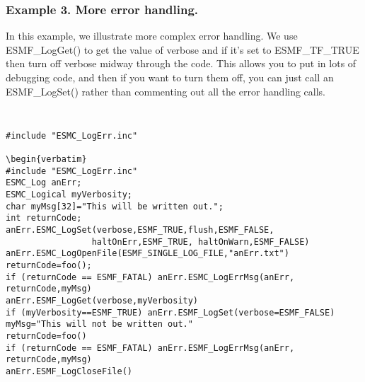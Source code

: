 \subsubsection{Example 3. More error handling. }

In this example, we illustrate more complex error handling.  We use
ESMF\_LogGet() to get the value of verbose and if it's set to ESMF\_TF\_TRUE
then turn off verbose midway through the code.  This allows you to put in lots
of debugging code, and then if you want to turn them off, you can just call
an ESMF\_LogSet() rather than commenting out all the error handling calls.
{\tt
\begin{verbatim}
#include "ESMC_LogErr.inc"

\begin{verbatim}
#include "ESMC_LogErr.inc" 
ESMC_Log anErr;
ESMC_Logical myVerbosity;
char myMsg[32]="This will be written out.";
int returnCode; 
anErr.ESMC_LogSet(verbose,ESMF_TRUE,flush,ESMF_FALSE,
                 haltOnErr,ESMF_TRUE, haltOnWarn,ESMF_FALSE)
anErr.ESMC_LogOpenFile(ESMF_SINGLE_LOG_FILE,"anErr.txt")
returnCode=foo();
if (returnCode == ESMF_FATAL) anErr.ESMC_LogErrMsg(anErr, returnCode,myMsg) 
anErr.ESMF_LogGet(verbose,myVerbosity)
if (myVerbosity==ESMF_TRUE) anErr.ESMF_LogSet(verbose=ESMF_FALSE)
myMsg="This will not be written out."
returnCode=foo()
if (returnCode == ESMF_FATAL) anErr.ESMF_LogErrMsg(anErr, returnCode,myMsg)
anErr.ESMF_LogCloseFile()
\end{verbatim}
\tt}

